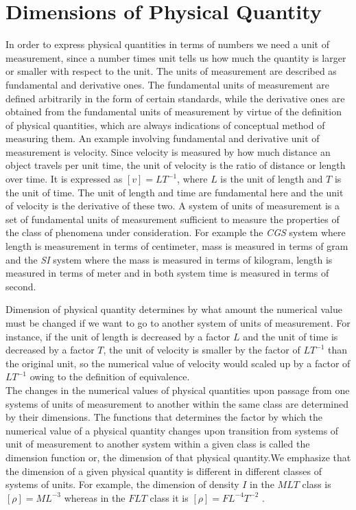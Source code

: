 \section{Dimensions of Physical Quantity}
	In order to express physical quantities in terms of numbers we need a unit of measurement, since a number times unit tells us how much the quantity is larger or smaller with respect to the unit. The units of measurement are described as fundamental and derivative ones. The fundamental units of measurement are defined arbitrarily in the form of certain standards, while the derivative ones are obtained from the fundamental units of measurement by virtue of the definition of physical quantities, which are always indications of conceptual method of measuring them. An example involving fundamental and derivative unit of measurement is velocity. Since velocity is measured by how much distance an object travels per unit time, the unit of velocity is the ratio of distance or length over time. It is expressed as $\left[v\right] = LT^{-1}$, where $L$ is the unit of length and $T$ is the unit of time. The unit of length and time are fundamental here and the unit of velocity is the derivative of these two. A system of units of measurement is a set of fundamental units of measurement sufficient to measure the properties of the class of phenomena under consideration. For example the \textit{CGS} system where length is measurement in terms of centimeter, mass is measured in terms of gram and the \textit{SI} system where the mass is measured in terms of kilogram, length is measured in terms of meter and in both system time is measured in terms of second.
	
	
	Dimension of physical quantity determines by what amount the numerical value must be changed if we want to go to another system of units of measurement. For instance, if the unit of length is decreased by a factor $L$ and the unit of time is decreased by a factor $T$, the unit of velocity is smaller by the factor of $LT^{-1}$ than the original unit, so the numerical value of velocity would scaled up by a factor of $LT^{-1}$ owing to the definition of equivalence.\\
	The changes in the numerical values of physical quantities upon passage from one systems of	units of measurement to another within the same class are determined by their dimensions. The	functions that determines the factor by which the numerical value of a physical quantity changes	upon transition from systems of unit of measurement to another system within a given class is	called the dimension function or, the dimension of that physical quantity.We emphasize that the	dimension of a given physical quantity is different in different classes of systems of units. For	example, the dimension of density $I$ in the $MLT$ class is $[\rho] = ML^{-3}$ whereas in the $FLT$ class it	is $[\rho] = F L^{-4}T^{-2}$ \cite{dimension_class_FLT, Sabbir}.
	
